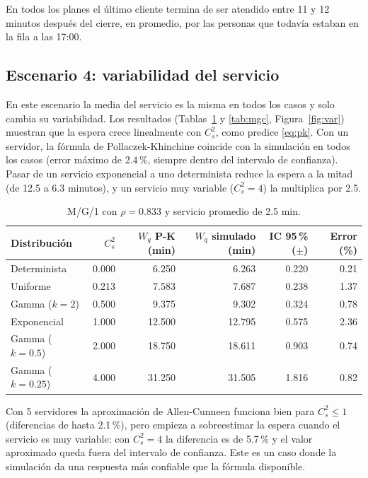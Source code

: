 \documentclass[11pt,letterpaper]{article}
\begin{document}
En todos los planes el último cliente termina de ser atendido entre 11 y 12 minutos
después del cierre, en promedio, por las personas que todavía estaban en la fila a las
17:00.

\subsection{Escenario 4: variabilidad del servicio}
En este escenario la media del servicio es la misma en todos los casos y solo cambia su
variabilidad. Los resultados (Tablas~\ref{tab:mg1} y \ref{tab:mgc}, Figura~\ref{fig:var})
muestran que la espera crece linealmente con $C_s^2$, como predice \eqref{eq:pk}. Con un
servidor, la fórmula de Pollaczek-Khinchine coincide con la simulación en todos los casos
(error máximo de 2.4\,\%, siempre dentro del intervalo de confianza). Pasar de un servicio
exponencial a uno determinista reduce la espera a la mitad (de 12.5 a 6.3 minutos), y un
servicio muy variable ($C_s^2 = 4$) la multiplica por 2.5.

\begin{table}[H]
\centering
\caption{M/G/1 con $\rho = 0.833$ y servicio promedio de 2.5 min.}
\label{tab:mg1}
\small
\begin{tabular}{@{}lrrrrr@{}}
\toprule
Distribución & $C_s^2$ & $W_q$ P-K (min) & $W_q$ simulado (min) & IC 95\,\% ($\pm$) & Error (\%) \\
\midrule
Determinista & 0.000 & 6.250 & 6.263 & 0.220 & 0.21 \\
Uniforme & 0.213 & 7.583 & 7.687 & 0.238 & 1.37 \\
Gamma ($k=2$) & 0.500 & 9.375 & 9.302 & 0.324 & 0.78 \\
Exponencial & 1.000 & 12.500 & 12.795 & 0.575 & 2.36 \\
Gamma ($k=0.5$) & 2.000 & 18.750 & 18.611 & 0.903 & 0.74 \\
Gamma ($k=0.25$) & 4.000 & 31.250 & 31.505 & 1.816 & 0.82 \\
\bottomrule
\end{tabular}
\end{table}

Con 5 servidores la aproximación de Allen-Cunneen funciona bien para $C_s^2 \le 1$
(diferencias de hasta 2.1\,\%), pero empieza a sobreestimar la espera cuando el servicio es
muy variable: con $C_s^2 = 4$ la diferencia es de 5.7\,\% y el valor aproximado queda fuera
del intervalo de confianza. Este es un caso donde la simulación da una respuesta más
confiable que la fórmula disponible.
\end{document}
